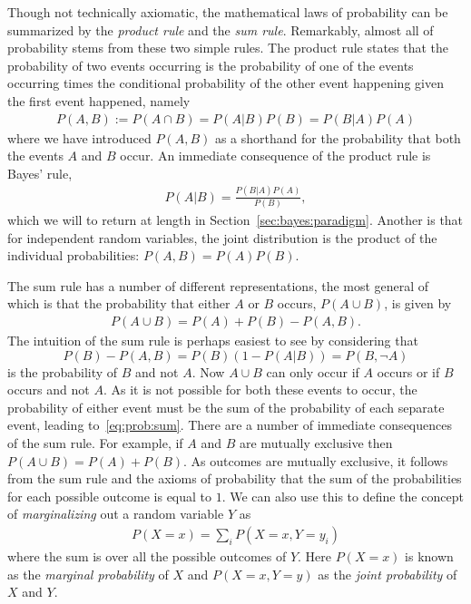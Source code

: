 Though not technically axiomatic, the mathematical laws of probability can be summarized by the \emph{product rule}
and the \emph{sum rule}.  Remarkably, almost all of probability stems from these two simple rules.
The product rule states that the probability of two events occurring is the probability of one of the events
occurring times the conditional probability of the other event happening given the first event happened, namely
\begin{align}
\label{eq:prob:prod}
P(A,B) := P(A \cap B) = P(A|B) P(B) =  P(B|A) P(A)
\end{align}
where we have introduced $P(A,B)$ as a shorthand for the probability that both the events $A$ and $B$ occur.
An immediate consequence of the product rule is Bayes' rule,
\begin{align}
P(A|B) = \frac{P(B|A)P(A)}{P(B)},
\end{align}
which we will to return at length in Section~\ref{sec:bayes:paradigm}.
Another is that for independent random variables, the joint distribution is the product of the
individual probabilities: $P(A,B)=P(A)P(B)$.

The sum rule has a number of different representations, the most general of which is that 
the probability that either $A$ or $B$ occurs, $P(A\cup B)$, is given by
\begin{align}
\label{eq:prob:sum}
P(A \cup B) = P(A) + P(B) - P(A, B).
\end{align}
The intuition of the sum rule is perhaps easiest to see by considering that
\[
P(B) - P(A, B) = P(B)(1-P(A|B)) = P(B, \neg A)
\]
 is the probability of $B$ and 
not $A$.  Now $A\cup B$ can only occur if $A$ occurs or if $B$ occurs and not $A$.  As it is not
possible for both these events to occur, the probability of either event must be the sum of the
probability of each separate event, leading to~\eqref{eq:prob:sum}.
There are a number of immediate consequences of the sum rule.  For example, if $A$ and $B$ are
mutually exclusive then $P(A\cup B) = P(A) + P(B)$.  As outcomes are mutually exclusive, it
follows from the sum rule and the axioms of probability that the sum of the probabilities
for each possible outcome is equal to $1$.  We can also use this to
define the concept of \emph{marginalizing} out a random variable $Y$ as
\begin{align}
\label{eq:prob:marginal}
P(X=x) = \sum_{i} P(X=x,Y=y_i)
\end{align}
where the sum is over all the possible outcomes of $Y$.  Here $P(X=x)$ is known as the
\emph{marginal probability} of $X$ and $P(X=x,Y=y)$ as the \emph{joint probability} of $X$
and $Y$.

